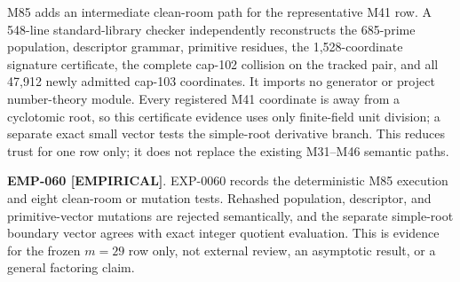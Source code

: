 \documentclass[11pt]{article}
\newcommand{\claimstatus}[2]{\textbf{#1 [#2]}}
\begin{document}
M85 adds an intermediate clean-room path for the representative M41 row.
A 548-line standard-library checker independently reconstructs the 685-prime
population, descriptor grammar, primitive residues, the 1,528-coordinate
signature certificate, the complete cap-102 collision on the tracked pair,
and all 47,912 newly admitted cap-103 coordinates. It imports no generator or
project number-theory module. Every registered M41 coordinate is away from a
cyclotomic root, so this certificate evidence uses only finite-field unit
division; a separate exact small vector tests the simple-root derivative
branch. This reduces trust for one row only; it does not replace the existing
M31--M46 semantic paths.

\claimstatus{EMP-060}{EMPIRICAL}. EXP-0060 records the deterministic M85
execution and eight clean-room or mutation tests. Rehashed population,
descriptor, and primitive-vector mutations are rejected semantically, and the
separate simple-root boundary vector agrees with exact integer quotient
evaluation. This is evidence for the frozen \(m=29\) row only, not external
review, an asymptotic result, or a general factoring claim.
\end{document}
